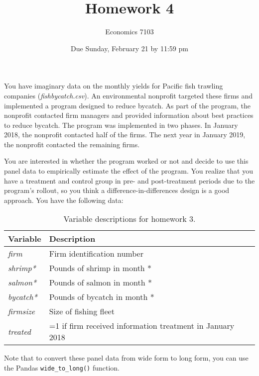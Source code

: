 \documentclass{article}
\title{Homework 4}
\author{Economics 7103}
\date{Due Sunday, February 21 by 11:59 pm}
\begin{document}
  
\maketitle

\noindent You have imaginary data on the monthly yields for Pacific fish trawling companies (\textit{fishbycatch.csv}).  An environmental nonprofit targeted these firms and implemented a program designed to reduce bycatch.  As part of the program, the nonprofit contacted firm managers and provided information about best practices to reduce bycatch.  The program was implemented in two phases.  In January 2018, the nonprofit contacted half of the firms.  The next year in January 2019, the nonprofit contacted the remaining firms.

You are interested in whether the program worked or not and decide to use this panel data to empirically estimate the effect of the program.  You realize that you have a treatment and control group in pre- and post-treatment periods due to the program's rollout, so you think a difference-in-differences design is a good approach.  You have the following data:

\begin{table}[h]
    \centering
    \begin{tabular}{l|l}
        Variable & Description \\ \hline
         \textit{firm} & Firm identification number  \\
         \textit{shrimp*} & Pounds of shrimp in month * \\
         \textit{salmon*} & Pounds of salmon in month * \\
         \textit{bycatch*} & Pounds of bycatch in month * \\
         \textit{firmsize} & Size of fishing fleet \\
         \textit{treated} & =1 if firm received information treatment in January 2018 \\
    \end{tabular}
    \caption{Variable descriptions for homework 3.}
    \label{tab:variables}
\end{table}

Note that to convert these panel data from wide form to long form, you can use the Pandas \verb!wide_to_long()! function.
\end{document}
